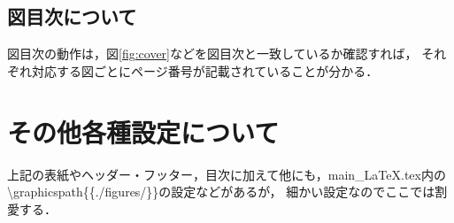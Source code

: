 \subsection{図目次について}
図目次の動作は，図\ref{fig:cover}などを図目次と一致しているか確認すれば，
それぞれ対応する図ごとにページ番号が記載されていることが分かる．


\section{その他各種設定について}
上記の表紙やヘッダー・フッター，目次に加えて他にも，main\_LaTeX.tex内の
\textbackslash graphicspath\{\{./figures/\}\}の設定などがあるが，
細かい設定なのでここでは割愛する．
